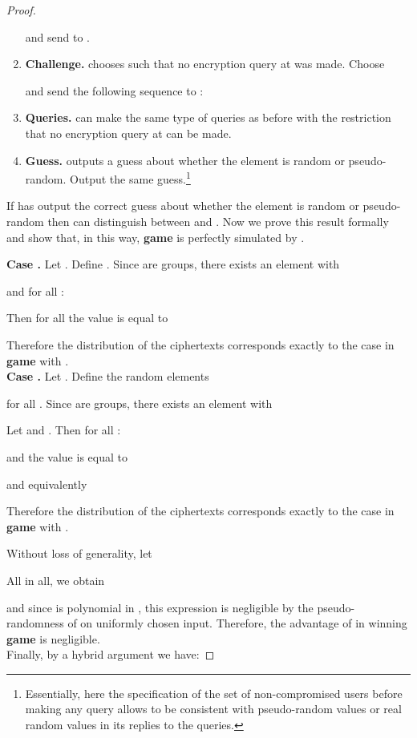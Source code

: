 \documentclass[10pt]{extarticle}
\begin{document}
\begin{proof}
\begin{enumerate}
and send  to .
\item\textbf{Challenge.}  chooses  such that no encryption query at  was made. Choose 

and send the following sequence to : 

\item\textbf{Queries.}  can make the same type of queries as before with the restriction that no encryption query at  can be made.
\item\textbf{Guess.}  outputs a guess about whether the  element is random or pseudo-random. Output the same guess.\footnote{Essentially, here the specification of the set of non-compromised users before making any query allows  to be consistent with pseudo-random values or real random values in its replies to the queries.} 
\end{enumerate}
If  has output the correct guess about whether the  element is random or pseudo-random then  can distinguish between  and . Now we prove this result formally and show that, in this way, \textbf{game}  is perfectly simulated by .\par\medskip

\noindent\textbf{Case .} Let . Define . Since  are groups, there exists an element  with 

and for all :

Then for all  the value  is equal to

Therefore the distribution of the ciphertexts corresponds exactly to the case in \textbf{game}  with .\\

\noindent\textbf{Case .} Let . Define the random elements 
 
for all . Since  are groups, there exists an element  with 
 
Let  and . Then for all :
 
and the value  is equal to

and equivalently 

Therefore the distribution of the ciphertexts corresponds exactly to the case in \textbf{game}  with .\par\medskip

\noindent Without loss of generality, let 

All in all, we obtain

and since  is polynomial in , this expression is negligible by the pseudo-randomness of  on uniformly chosen input. Therefore, the advantage of  in winning \textbf{game}  is negligible.\\ 
Finally, by a hybrid argument we have:

\end{proof}\par\medskip
\end{document}
